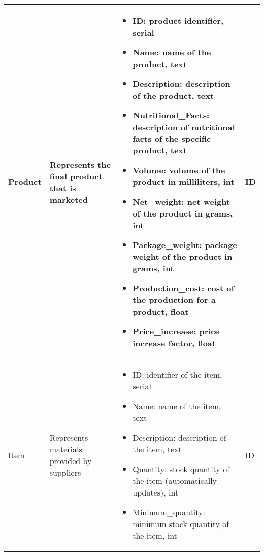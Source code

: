 \begin{longtable}{|p{}|p{} |p{}|p{} |}
    Product & Represents the final product that is marketed &
    \begin{itemize}
        \vspace{-1em}
        \item ID:   product identifier, serial
        \item Name:   name of the product, text
        \item Description:   description of the product, text
        \item Nutritional\_Facts: description of nutritional facts of the specific product, text
        \item Volume:   volume of the product in milliliters, int
        \item Net\_weight:   net weight of the product in grams, int
        \item Package\_weight:   package weight of the product in grams, int
        \item Production\_cost:   cost of the production for a product, float
        \item Price\_increase:   price increase factor, float                         %
    \end{itemize}
    &  ID \\\hline

    Item & Represents materials provided by suppliers &
    \begin{itemize}
        \vspace{-1em}
        \item ID:   identifier of the item, serial
        \item Name:   name of the item, text
        \item Description:   description of the item, text
        \item Quantity:   stock quantity of the item (automatically updates), int
        \item Minimum\_quantity:   minimum stock quantity of the item, int
    \end{itemize}
    &  ID \\\hline


\end{longtable}
